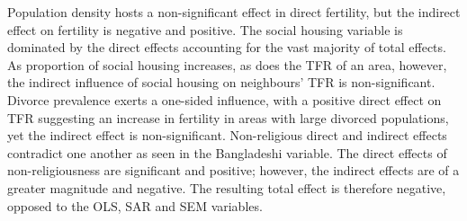 \documentclass[12pt,twoside]{reedthesis}
\begin{document}
Population density hosts a non-significant effect in direct fertility, but the indirect effect on fertility is negative and positive. The social housing variable is dominated by the direct effects accounting for the vast majority of total effects. As proportion of social housing increases, as does the TFR of an area, however, the indirect influence of social housing on neighbours' TFR is non-significant. Divorce prevalence exerts a one-sided influence, with a positive direct effect on TFR suggesting an increase in fertility in areas with large divorced populations, yet the indirect effect is non-significant. Non-religious direct and indirect effects contradict one another as seen in the Bangladeshi variable. The direct effects of non-religiousness are significant and positive; however, the indirect effects are of a greater magnitude and negative. The resulting total effect is therefore negative, opposed to the OLS, SAR and SEM variables.
\end{document}
